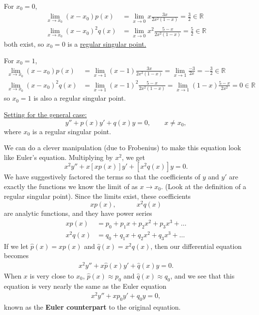 \documentclass[11pt, letterpaper, oneside]{article}     %
\numberwithin{equation}{subsection}
\theoremstyle{definition}
\numberwithin{theorem}{section}
\theoremstyle{remark}
\newcommand{\RR}{\mathbb{R}}
\begin{document}
\begin{enumerate}
  For $x_0 = 0$,
  \begin{align}
    \lim_{x\to x_0}(x-x_0)p(x) &= \lim_{x\to 0} x\frac{3x}{2x^2(1-x)} = \frac{3}{2} \in \RR\\
    \lim_{x\to x_0}(x-x_0)^2q(x) &= \lim_{x\to 0} x^2\frac{5-x}{2x^2(1-x)} = \frac{5}{2} \in \RR
  \end{align}
  both exist, so $x_0 = 0$ is a \underline{regular singular point.}

  For $x_0 = 1$,
  \begin{align}
    \lim_{x\to x_0}(x-x_0)p(x) &= \lim_{x\to 1} (x-1)\frac{3x}{2x^2(1-x)} = \lim_{x\to 1} \frac{-3}{2x} = -\frac{3}{2} \in \RR\\
    \lim_{x\to x_0}(x-x_0)^2q(x) &= \lim_{x\to 1} (x-1)^2\frac{5-x}{2x^2(1-x)} = \lim_{x\to 1} (1-x)\frac{5-x}{2x^2} = 0 \in \RR
  \end{align}
  so $x_0 = 1$ is also a regular singular point.

  \underline{Setting for the general case:}
  \begin{equation}\label{eq:general-second-order-homo}
    y'' + p(x)y' + q(x)y = 0, \quad\quad x\neq x_0,
  \end{equation}
  where $x_0$ is a regular singular point.

  We can do a clever manipulation (due to Frobenius) to make this equation look like Euler's equation. Multiplying by $x^2$, we get
  \begin{equation}
    x^2y'' + x[xp(x)]y' + [x^2q(x)]y = 0.
  \end{equation}
  We have suggestively factored the terms so that the coefficients of $y$ and $y'$ are exactly the functions we know the limit of as $x \to x_0$. (Look at the definition of a regular singular point). Since the limits exist, these coefficients
  \begin{equation}
    xp(x),\quad\quad\quad x^2q(x)
  \end{equation}
  are analytic functions, and they have power series
  \begin{align}
    xp(x) &= p_0 + p_1x + p_2x^2 + p_3x^3 + \dots\\
    x^2q(x) &= q_0 + q_1x + q_2x^2 + q_3x^3 + \dots
  \end{align}
  If we let $\hat p(x) = xp(x)$ and $\hat q(x) = x^2q(x)$, then our differential equation becomes
  \begin{align}
    x^2y'' + x\hat p(x)y' + \hat q(x)y = 0.
  \end{align}
  When $x$ is very close to $x_0$, $\hat p(x) \approx p_0$ and $\hat q(x) \approx q_0$, and we see that this equation is very nearly the same as the Euler equation
  \begin{align}
    x^2y'' + xp_0y' + q_0y = 0,
  \end{align}
  known as the \textbf{Euler counterpart} to the original equation.


\end{enumerate}
\end{document}

